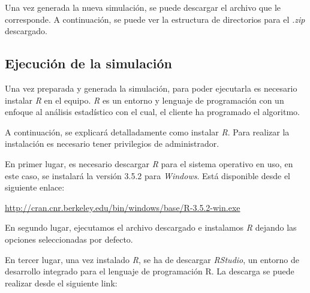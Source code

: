 \newpage

Una vez generada la nueva simulación, se puede descargar el archivo que le corresponde. A continuación, se puede ver la estructura de directorios para el \textit{.zip} descargado. \label{label:export-sim}


\subsection{Ejecución de la simulación}

Una vez preparada y generada la simulación, para poder ejecutarla es necesario instalar \textit{R} en el equipo. \textit{R} es un entorno y lenguaje de programación con un enfoque al análisis estadístico con el cual, el cliente ha programado el algoritmo.

A continuación, se explicará detalladamente como instalar \textit{R}. Para realizar la instalación es necesario tener privilegios de administrador.

En primer lugar, es necesario descargar \textit{R} para el sistema operativo en uso, en este caso, se instalará la versión 3.5.2 para \textit{Windows}. Está disponible desde el siguiente enlace: 

\url{http://cran.cnr.berkeley.edu/bin/windows/base/R-3.5.2-win.exe}

En segundo lugar, ejecutamos el archivo descargado e instalamos \textit{R} dejando las opciones seleccionadas por defecto.

En tercer lugar, una vez instalado \textit{R}, se ha de descargar \textit{RStudio}, un entorno de desarrollo integrado para el lenguaje de programación R. La descarga se puede realizar desde el siguiente link:

